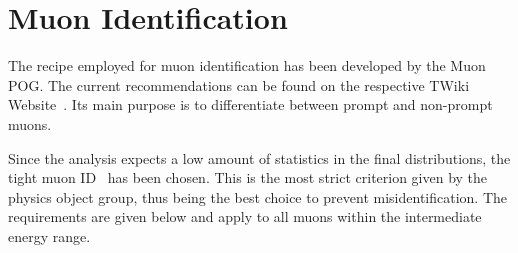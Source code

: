 \section{Muon Identification}
\label{sec:muonid}

The recipe employed for muon identification has been developed by the Muon POG. The current recommendations can be found on the respective TWiki Website~\cite{muonpog}. Its main purpose is to differentiate between prompt and non-prompt muons.

Since the analysis expects a low amount of statistics in the final distributions, the tight muon ID~\cite{muonid1, muonid2} has been chosen. This is the most strict criterion given by the physics object group, thus being the best choice to prevent misidentification. The requirements are given below and apply to all muons within the intermediate energy range.

